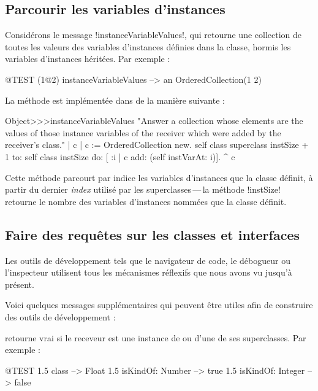 \documentclass[a4paper,10pt,twoside]{book}
\begin{document}
\subsection{Parcourir les variables d'instances}

Considérons le message \ct!instanceVariableValues!, qui retourne une collection de toutes les valeurs des variables d'instances définies dans la classe, hormis les variables d'instances héritées.
Par exemple :
\begin{code}{@TEST}
(1@2) instanceVariableValues --> an OrderedCollection(1 2)
\end{code}

La méthode est implémentée dans  de la manière suivante :
\begin{code}{}
Object>>>instanceVariableValues
	"Answer a collection whose elements are the values of those instance variables of the receiver which were added by the receiver's class."	
	| c |
	c := OrderedCollection new.
	self class superclass instSize + 1
		to: self class instSize
		do: [ :i | c add: (self instVarAt: i)].
	^ c
\end{code}

Cette méthode parcourt par indice les variables d'instances que la classe définit, à partir du dernier \emph{index} utilisé par les superclasses\,---\,la méthode \ct!instSize! retourne le nombre des variables d'instances nommées que la classe définit.

\subsection{Faire des requêtes sur les classes et interfaces}

Les outils de développement \pharo tels que le navigateur de code, le débogueur ou l'inspecteur utilisent tous les mécanismes réflexifs que nous avons vu jusqu'à présent.

Voici quelques messages supplémentaires qui peuvent être utiles afin de construire des outils de développement :

 retourne vrai si le receveur est une instance de  ou d'une de ses superclasses.
Par exemple :
\begin{code}{@TEST}
1.5 class                     --> Float
1.5 isKindOf: Number --> true
1.5 isKindOf: Integer   --> false
\end{code}
\end{document}
